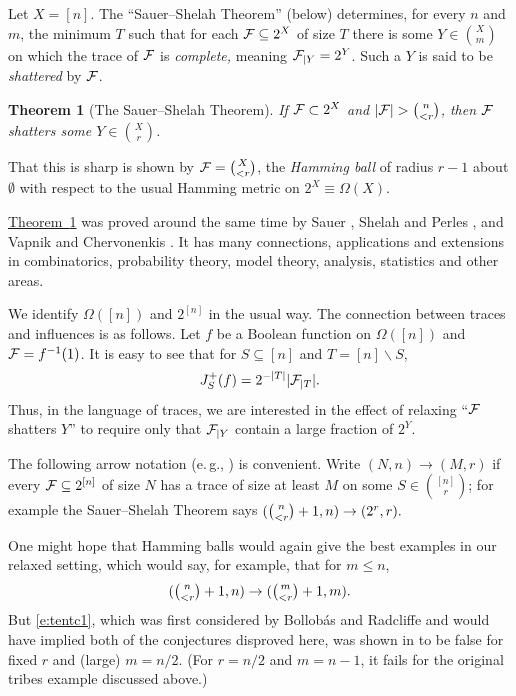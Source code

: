\documentclass[11pt]{article}
\numberwithin{equation}{section}
\theoremstyle{definition}
\theoremstyle{plain}
\newcommand{\eg}{e.\,g.}
\newcommand{\expref}[2]{\hyperref[#2]{#1~\ref{#2}}}
\newtheorem{thm}{Theorem}[section]
\newcommand{\nin}[0]{\noindent}
\newcommand{\sub}[0]{\subseteq}
\newcommand{\f}[0]{{\cal F}}
\newcommand{\0}[0]{\emptyset}
\newcommand{\Cc}[0]{\tbinom}
\newcommand{\gO}[0]{\Omega}
\begin{document}
Let $X = [n]$.
%
The ``Sauer--Shelah Theorem'' (below)
determines, for every $n$ and $m$, the minimum $T$
such that for each $\f\sub 2^X$ of size $T$ there is some
$Y \in \binom{X}{m}$ on which the trace of $\f$ is \emph{complete,}
meaning ${\cal F}_{|Y}=2^Y$. Such a $Y$
is said to be \emph{shattered} by ${\cal F}$.

\begin {thm}[The Sauer--Shelah Theorem]
\label {t:sas}
If ${\cal F} \subset 2^{X}$ and
$|\f| > \binom{n}{< r} $,
%
then $\f$ shatters some $Y\in \binom{X}{r}$.
\end {thm}

\nin
That this is sharp is shown by
${\cal F} = \binom{X}{< r}$, the \emph{Hamming ball}
of radius $r-1$ about
$\0$ with respect to the usual Hamming metric on
$2^{X}\equiv \gO(X)$.

\expref{Theorem}{t:sas} was proved
around the same time by Sauer \cite {Sa},
Shelah and Perles \cite{Sh}, and Vapnik and Chervonenkis \cite {VC}.
%
It has many connections, applications and extensions
in combinatorics, probability theory, model theory, analysis, statistics
and other areas.
%

We identify $\gO([n])$ and $2^{[n]}$ in the usual way.
The connection between traces and influences is as follows.
Let $f$ be a Boolean function on $\gO([n])$
and
${\cal F} =f^{-1}(1)$.
It is easy to see
that for
$S\sub [n]$ and $T = [n] \backslash S$,
$$J^+_S(f)=2^{-|T|}|{\cal F}_{|T}| .$$
Thus, in the language of traces, we are interested in
the effect of relaxing ``$\f$ shatters $Y$''
to require only that
${\cal F}_{|Y}$ contain a large fraction of $2^Y$.

The following arrow notation
(\eg, \cite {Bo,Fr,AMS19}) is convenient.  Write
$(N,n) \to (M,r)$ if every $\f\sub 2^{[n]}$
of size %
$N$   %
has a trace of size at least $M$ on some
$S \in \binom{[n]}{r}$; for example the Sauer--Shelah Theorem
says $(\Cc{n}{< r}+1,n) \to (2^r,r).$


\medskip
One might hope that Hamming balls would again give the
best examples in our relaxed setting, which would say, for example,
that for $m \le n$,
\begin {equation}
\label{e:tentc1}
(\Cc{n}{< r}+1,n) \to (\Cc{m}{< r}+1,m).
\end {equation}
But \eqref{e:tentc1}, which was first considered by
Bollob\'as and Radcliffe \cite{BR}
and would have implied both of the conjectures
disproved here,
was shown in \cite{BR} to be false
for fixed $r$ and (large) $m=n/2$.
(For $r=n/2$
and $m=n-1$, it fails for the original tribes example
discussed above.)
\end{document}
